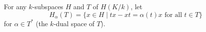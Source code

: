 For any $k$-subspaces $H$ and $T$ of $H(K/k)$, let $$H_\alpha(T) = \{x \in H \mid tx - xt = \alpha(t)x \text{ for all } t \in T\}$$ for $\alpha \in T^*$ (the $k$-dual space of $T$).
